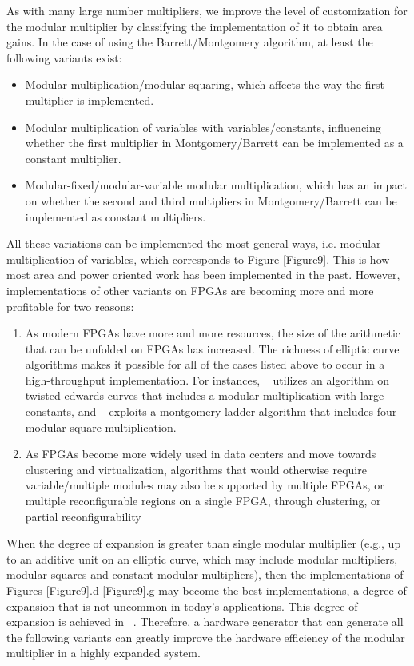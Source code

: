 \documentclass[conference]{IEEEtran}
\begin{document}
As with many large number multipliers,  we improve the level of customization for the modular multiplier by classifying the implementation of it to obtain area gains. In the case of using the Barrett/Montgomery algorithm, at least the following variants exist:
\begin{itemize}
    \item Modular multiplication/modular squaring, which affects the way the first multiplier is implemented.
    \item Modular multiplication of variables with variables/constants, influencing whether the first multiplier in Montgomery/Barrett can be implemented as a constant multiplier.
    \item Modular-fixed/modular-variable modular multiplication, which has an impact on whether the second and third multipliers in Montgomery/Barrett can be implemented as constant multipliers.
\end{itemize}

All these variations can be implemented the most general ways, i.e. modular multiplication of variables, which corresponds to Figure \ref{Figure9}. This is how most area and power oriented work has been implemented in the past.  However, implementations of other variants on FPGAs are becoming more and more profitable for two reasons:
\begin{enumerate}[(1)]
    \item As modern FPGAs have more and more resources, the size of the arithmetic that can be unfolded on FPGAs has increased. The richness of elliptic curve algorithms makes it possible for all of the cases listed above to occur in a high-throughput implementation. For instances, ~\cite{FPGA_Acceleration_of_Multi_Scalar_Multiplication_CycloneMSM} utilizes an algorithm on twisted edwards curves that includes a modular multiplication with large constants, and ~\cite{PipeMSM} exploits a montgomery ladder algorithm that includes four modular square multiplication.
    \item As FPGAs become more widely used in data centers and move towards clustering and virtualization, algorithms that would otherwise require variable/multiple modules may also be supported by multiple FPGAs, or multiple reconfigurable regions on a single FPGA, through clustering, or partial reconfigurability
\end{enumerate}

When the degree of expansion is greater than single modular multiplier (e.g., up to an additive unit on an elliptic curve, which may include modular multipliers, modular squares and constant modular multipliers),  then the implementations of Figures \ref{Figure9}.d-\ref{Figure9}.g may become the best implementations, a degree of expansion that is not uncommon in today's applications. This degree of expansion is achieved in ~\cite{FPGA_Acceleration_of_Multi_Scalar_Multiplication_CycloneMSM}. Therefore, a hardware generator that can generate all the following variants can greatly improve the hardware efficiency of the modular multiplier in a highly expanded system.
\end{document}
